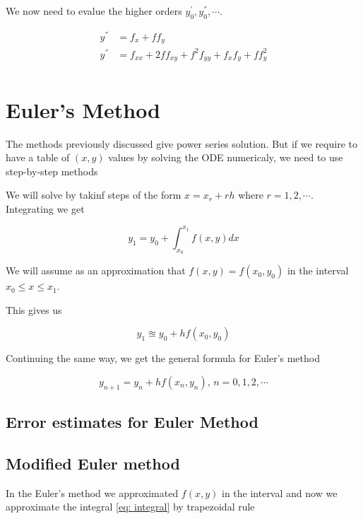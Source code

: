 \documentclass[10pt,a4paper]{article}
\begin{document}
We now need to evalue the higher orders $y^{'}_{0},y^{''}_{0},\cdots$. 

\begin{align}
    y^{''} &= f_{x} + f f_{y} \\
    y^{''} &= f_{xx} + 2 f f_{xy} + f^2 f_{yy} + f_{x} f_{y} + f f^{2}_{y}\\
\end{align}




\section{Euler's Method}

The methods previously discussed give power series solution. But if we require
to have a table of $(x,y)$ values by solving the ODE numericaly, we need to use step-by-step methods

We will solve by takinf steps of the form $x = x_{r} + r h$ where
$r = 1,2,\cdots$. Integrating  we get


\begin{equation}
    y_{1} = y_{0} + \int_{x_{0}}^{x_{1}} f(x,y) dx
    \label{eq: integral}
\end{equation}

We will assume as an approximation that $f(x,y) = f(x_{0},y_{0})$ in the interval
$x_{0} \leq x \leq x_{1}$.

This gives us 

\begin{equation}
    y_{1} \approxeq y_{0} + h f(x_{0},y_{0})
\end{equation}

Continuing the same way, we get the general formula for Euler's method


\begin{equation}
    y_{n+1} = y_{n} + h f(x_{n},y_{n}), \, n = 0,1,2,\cdots
\end{equation}

\subsection{Error estimates for Euler Method}




\subsection{Modified Euler method}

In the Euler's method we approximated $f(x,y)$ in the interval and now we 
approximate the integral \eqref{eq: integral} by trapezoidal rule 
\end{document}
